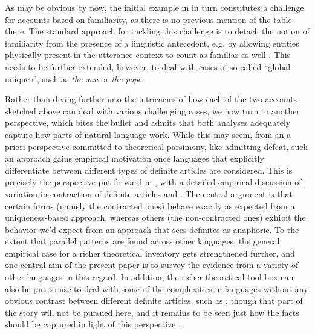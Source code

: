 \documentclass[output=paper
,modfonts
,nonflat]{langscibook}
\begin{document}
As may be obvious by now, the initial example in  in turn
constitutes a challenge for accounts based on familiarity, as there is
no previous mention of the table there. The standard approach for
tackling this challenge is to detach the notion of familiarity from
the presence of a linguistic antecedent, e.g. by allowing entities
physically present in the utterance context to count as familiar as
well \citep[for extensive discussion of the pertinent distinction
between weak and strong familiarity, see][]{Roberts2003}. This needs to be further extended, however, to deal with
cases of so-called ``global uniques'', such as \textit{the sun} or
\textit{the pope}. 

Rather than diving further into the intricacies of how each of the two
accounts sketched above can deal with various challenging cases, we
now turn to another perspective, which bites the bullet and admits
that both analyses adequately capture how parts of natural language
work. While this may seem, from an a priori
perspective committed to theoretical parsimony, like admitting defeat,
such an approach gains empirical motivation once languages that
explicitly differentiate between different types of definite articles
are considered. This is precisely the perspective put forward in
\citet{Schwarz2009}, with a detailed empirical discussion of variation
in contraction of definite articles and . The central
argument is that certain forms (namely the contracted ones) behave
exactly as expected from a uniqueness-based approach, whereas others
(the non-contracted ones) exhibit the behavior we'd expect from an
approach that sees definites as anaphoric. To the extent that parallel
patterns are found across other languages, the general empirical case
for a richer theoretical inventory gets strengthened further, and one
central aim of the present paper is to survey the evidence from a
variety of other languages in this regard. In addition, the richer
theoretical tool-box can also be put to use to deal with some of the
complexities in languages without any obvious contrast between different
definite articles, such as , though that part of the story will
not be pursued here, and it remains to be seen just how the 
facts should be captured in light of this perspective \citep[for
previous discussion of  data going beyond what can be captured
using just one of the two
approaches above, see, a.o.][]{BirnerWard1994,PoesioViera1998}.
\end{document}
